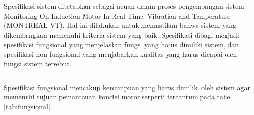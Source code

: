 \documentclass{elsinta}
\begin{document}
\newpage

\section{\SystemSpecTitle}
Spesifikasi sistem ditetapkan sebagai acuan dalam proses
pengembangan sistem Monitoring On Induction Motor In Real-Time:
Vibration and Temperature (MONTREAL-VT). Hal ini dilakukan 
untuk memastikan bahwa sistem yang dikembangkan memenuhi kriteria
sistem yang baik. Spesifikasi dibagi menjadi spesifikasi fungsional
yang menjelaskan fungsi yang harus dimiliki sistem, dan spesifikasi
non-fungsional yang menjabarkan kualitas yang harus
dicapai oleh fungsi sistem tersebut.

\subsection{\FunctionalSpecTitle}
Spesifikasi fungsional mencakup kemampuan yang harus 
dimiliki oleh sistem agar memenuhi tujuan pemantauan 
kondisi motor serperti tercantum pada tabel \ref{tab:fungsional}.
\end{document}
